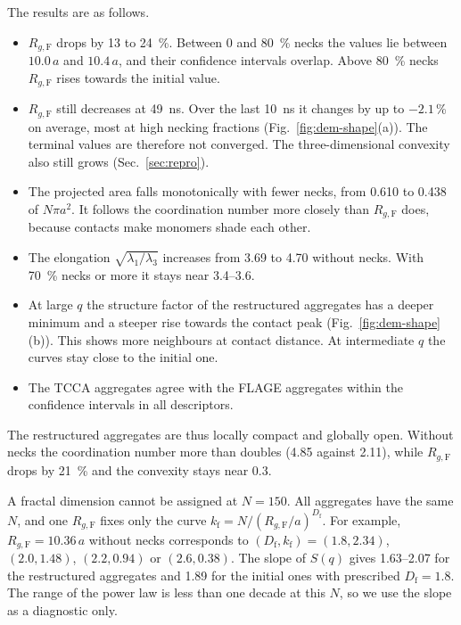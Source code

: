 \documentclass[11pt,a4paper]{article}
\newcommand{\Df}{D_\text{f}}
\begin{document}
The results are as follows.
\begin{itemize}
  \item $R_{g,\text{F}}$ drops by 13 to \SI{24}{\percent}.
        Between 0 and \SI{80}{\percent} necks the values lie between $10.0\,a$ and $10.4\,a$, and their confidence intervals overlap.
        Above \SI{80}{\percent} necks $R_{g,\text{F}}$ rises towards the initial value.
  \item $R_{g,\text{F}}$ still decreases at \SI{49}{\nano\second}.
        Over the last \SI{10}{\nano\second} it changes by up to $-2.1$\,\% on average, most at high necking fractions (Fig.~\ref{fig:dem-shape}(a)).
        The terminal values are therefore not converged.
        The three-dimensional convexity also still grows (Sec.~\ref{sec:repro}).
  \item The projected area falls monotonically with fewer necks, from 0.610 to 0.438 of $N\pi a^2$.
        It follows the coordination number more closely than $R_{g,\text{F}}$ does, because contacts make monomers shade each other.
  \item The elongation $\sqrt{\lambda_1/\lambda_3}$ increases from 3.69 to 4.70 without necks.
        With \SI{70}{\percent} necks or more it stays near 3.4--3.6.
  \item At large $q$ the structure factor of the restructured aggregates has a deeper minimum and a steeper rise towards the contact peak (Fig.~\ref{fig:dem-shape}(b)).
        This shows more neighbours at contact distance.
        At intermediate $q$ the curves stay close to the initial one.
  \item The TCCA aggregates agree with the FLAGE aggregates within the confidence intervals in all descriptors.
\end{itemize}

The restructured aggregates are thus locally compact and globally open.
Without necks the coordination number more than doubles (4.85 against 2.11), while $R_{g,\text{F}}$ drops by \SI{21}{\percent} and the convexity stays near 0.3.

A fractal dimension cannot be assigned at $N = 150$.
All aggregates have the same $N$, and one $R_{g,\text{F}}$ fixes only the curve $k_\text{f} = N/(R_{g,\text{F}}/a)^{\Df}$.
For example, $R_{g,\text{F}} = 10.36\,a$ without necks corresponds to $(\Df, k_\text{f}) = (1.8, 2.34)$, $(2.0, 1.48)$, $(2.2, 0.94)$ or $(2.6, 0.38)$.
The slope of $S(q)$ gives 1.63--2.07 for the restructured aggregates and 1.89 for the initial ones with prescribed $\Df = 1.8$.
The range of the power law is less than one decade at this $N$, so we use the slope as a diagnostic only.
\end{document}
